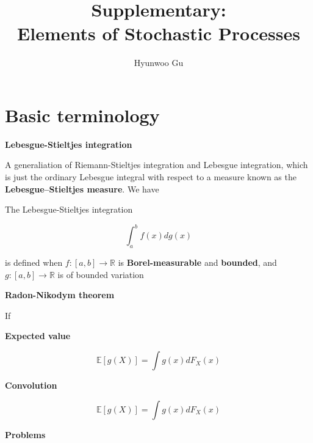 \documentclass[12pt]{article}
\theoremstyle{nonumberbreak}
\begin{document}
\title{\textbf{Supplementary: \\ Elements of Stochastic Processes}}
\author{Hyunwoo Gu}
\date{}

\maketitle



\section{Basic terminology}

\textbf{Lebesgue-Stieltjes integration}

A generaliation of Riemann-Stieltjes integration and Lebesgue integration, which is just the ordinary Lebesgue integral with respect to a measure known as the \textbf{Lebesgue–Stieltjes measure}. We have

\begin{center}

\end{center}


The Lebesgue-Stieltjes integration

$$
\int_a^b f(x) d g(x)
$$

is defined when $f: [a,b] \to \mathbb{R}$ is \textbf{Borel-measurable} and \textbf{bounded}, and $g : [a,b] \to \mathbb{R}$ is of bounded variation



\textbf{Radon-Nikodym theorem}

If 


\textbf{Expected value}

$$
\mathbb{E}[g(X)] = \int g(x) dF_X(x)
$$


\textbf{Convolution}

$$
\mathbb{E}[g(X)] = \int g(x) dF_X(x)
$$




\textbf{Problems}
\end{document}

